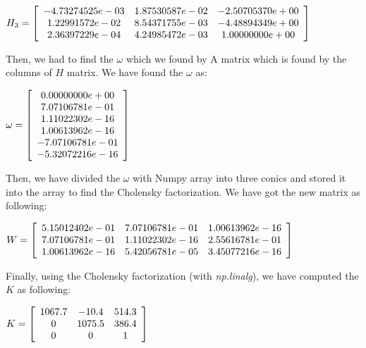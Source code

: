 \documentclass[]{article}
\begin{document}
\vspace{0.5em}


\centerline {
	$H_3 =\left[ {\begin{array}{*{20}c}
		-4.73274525e-03 & 1.87530587e-02 & -2.50705370e+00 \\
		1.22991572e-02 & 8.54371755e-03 & -4.48894349e+00  \\ 
		2.36397229e-04 & 4.24985472e-03 & 1.00000000e+00
		\end{array} } \right] $
}

Then, we had to find the $\omega$ which we found by A matrix which is found by the columns of $H$ matrix. We have found the $\omega$ as:

\vspace{0.5em}

\centerline {
	$ \omega =\left[ {\begin{array}{*{20}c}
		0.00000000e+00 \\
		7.07106781e-01 \\
		1.11022302e-16 \\
		1.00613962e-16 \\ 
		-7.07106781e-01 \\
		-5.32072216e-16
		\end{array} } \right] $
}

Then, we have divided the $\omega$ with Numpy array into three conics and stored it into the array to find the Cholensky factorization. We have got the new matrix as following:

\vspace{0.5em}

\centerline {
	$ W =\left[ {\begin{array}{*{20}c}
		5.15012402e-01 & 7.07106781e-01 & 1.00613962e-16 \\
		7.07106781e-01 & 1.11022302e-16 & 2.55616781e-01\\
		1.00613962e-16 & 5.42056781e-05 & 3.45077216e-16 
		\end{array} } \right] $
}

\vspace{0.5em}

Finally, using the Cholensky factorization (with \textit{np.linalg}), we have computed the $K$ as following:

\vspace{0.5em}

\centerline {
	$ K =\left[ {\begin{array}{*{20}c}
		1067.7 & -10.4 & 514.3 \\
		0 & 1075.5 & 386.4 \\
		0 & 0 & 1 
		\end{array} } \right] $
}
\end{document}
